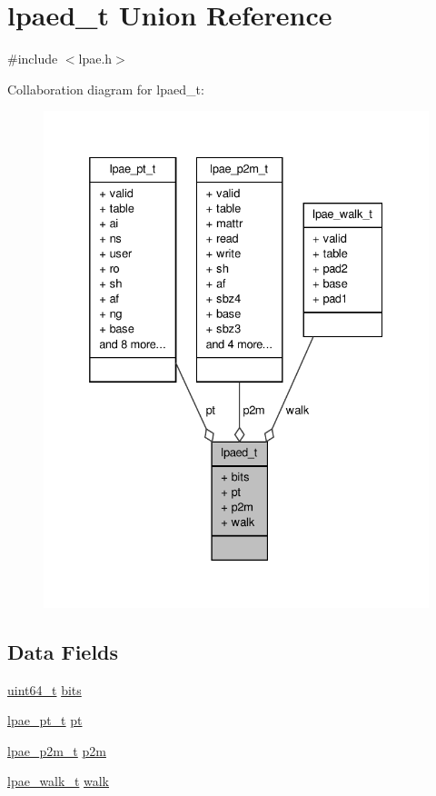 \hypertarget{unionlpaed__t}{\section{lpaed\-\_\-t \-Union \-Reference}
\label{unionlpaed__t}
}


{\ttfamily \#include $<$lpae.\-h$>$}



\-Collaboration diagram for lpaed\-\_\-t\-:
\nopagebreak
\begin{figure}[H]
\begin{center}
\leavevmode
\includegraphics[width=332pt]{unionlpaed__t__coll__graph}
\end{center}
\end{figure}
\subsection*{\-Data \-Fields}
\begin{DoxyCompactItemize}
\item 
\hyperlink{arch__types_8h_aaa5d1cd013383c889537491c3cfd9aad}{uint64\-\_\-t} \hyperlink{unionlpaed__t_a824af546b997aeefcb71a5fe0eda3a0a}{bits}
\item 
\hyperlink{structlpae__pt__t}{lpae\-\_\-pt\-\_\-t} \hyperlink{unionlpaed__t_acddbc2df6cd0023f42d3076bd91794df}{pt}
\item 
\hyperlink{structlpae__p2m__t}{lpae\-\_\-p2m\-\_\-t} \hyperlink{unionlpaed__t_a99761ab7c6ee8d403ed1a7483155089f}{p2m}
\item 
\hyperlink{structlpae__walk__t}{lpae\-\_\-walk\-\_\-t} \hyperlink{unionlpaed__t_a17c7b75f6d0703c70a29b68451c901f2}{walk}
\end{DoxyCompactItemize}


